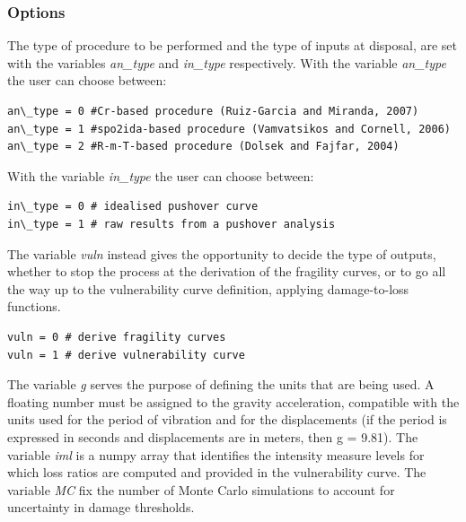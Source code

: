 \subsubsection{Options}
\label{subsubsec:options}
The type of procedure to be performed and the type of inputs at disposal, are set with the variables \textit{an\_type} and \textit{in\_type} respectively. With the variable \textit{an\_type} the user can choose between:

\begin{Verbatim}[frame=single, commandchars=\\\{\}, samepage=true]
an\_type = 0 #Cr-based procedure (Ruiz-Garcia and Miranda, 2007)
an\_type = 1 #spo2ida-based procedure (Vamvatsikos and Cornell, 2006)
an\_type = 2 #R-m-T-based procedure (Dolsek and Fajfar, 2004)
\end{Verbatim}

With the variable \textit{in\_type} the user can choose between:

\begin{Verbatim}[frame=single, commandchars=\\\{\}, samepage=true]
in\_type = 0 # idealised pushover curve
in\_type = 1 # raw results from a pushover analysis
\end{Verbatim}

The variable \textit{vuln} instead gives the opportunity to decide the type of outputs, whether to stop the process at the derivation of the fragility curves, or to go all the way up to the vulnerability curve definition, applying damage-to-loss functions.

\begin{Verbatim}[frame=single, commandchars=\\\{\}, samepage=true]
vuln = 0 # derive fragility curves 
vuln = 1 # derive vulnerability curve
\end{Verbatim}

The variable \textit{g} serves the purpose of defining the units that are being used. A floating number must be assigned to the gravity acceleration, compatible with the units used for the period of vibration and for the displacements (if the period is expressed in seconds and displacements are in meters, then g = 9.81). The variable \textit{iml} is a numpy array that identifies the intensity measure levels for which loss ratios are computed and provided in the vulnerability curve. The variable \textit{MC} fix the number of Monte Carlo simulations to account for uncertainty in damage thresholds.

